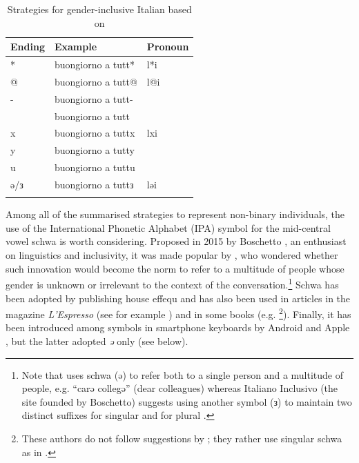 \begin{table}
    \caption[Strategies for gender-inclusive Italian]{Strategies for gender-inclusive Italian based on \textcite{vitiello2021linguaggio}}
    \label{tab:genderinclusiveitalian}
    \begin{tabular}{lll}
    \lsptoprule
        \textbf{Ending} & \textbf{Example} & \textbf{Pronoun} \\
\midrule
        * & buongiorno a tutt* & l*i \\
        @ & buongiorno a tutt@ & l@i \\
        - & buongiorno a tutt- & \\
         & buongiorno a tutt & \\
        x & buongiorno a tuttx & lxi \\
        y & buongiorno a tutty & \\
        u & buongiorno a tuttu & \\
        ə/з & buongiorno a tuttз & ləi \\
\lspbottomrule
    \end{tabular}
\end{table}

Among all of the summarised strategies to represent non-binary individuals, the use of the International Phonetic Alphabet (IPA) symbol for the mid-central vowel schwa is worth considering. Proposed in 2015 by Boschetto \citep{itainclusivostoria}, an enthusiast on linguistics and inclusivity, it was made popular by \textcite[167]{gheno2019femminili}, who wondered whether such innovation would become the norm to refer to a multitude of people whose gender is unknown or irrelevant to the context of the conversation.\footnote{Note that \textcite[167]{gheno2019femminili} uses schwa (ə) to refer both to a single person and a multitude of people, e.g. ``carə collegə'' (dear colleagues) whereas Italiano Inclusivo (the site founded by Boschetto) suggests using another symbol (з) to maintain two distinct suffixes for singular and for plural \citep{itainclusivocome}.} Schwa has been adopted by publishing house effequ \citep{effequschwa} and has also been used in articles in the magazine \textit{L'Espresso} (see for example \cite{murgia2021espresso}) and in some books (e.g. \cite{meloni2021belle}\footnote{These authors do not follow suggestions by \textcite{itainclusivocome}; they rather use singular schwa as in \textcite[167]{gheno2019femminili}.}). Finally, it has been introduced among symbols in smartphone keyboards by Android and Apple \citep{itainclusivostrumenti}, but the latter adopted \textit{ə} only (see below). 

